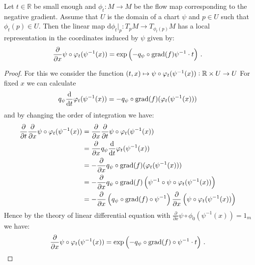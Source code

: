\begin{lemma}
	Let $t\in \mathbb{R}$ be small enough and $\phi_t: M\to M$ be the flow map corresponding to the negative gradient. Assume that $U$ is the domain of a chart $\psi$ and $p\in U$ such that $\phi_t(p)\in U$. Then the linear map $\mathrm{d} \phi_t \big|_p: T_pM\to T_{\phi_t(p)}M$ has a local representation in the coordinates induced by $\psi$ given by:
	\[
\frac{\partial}{\partial x} \psi \circ \varphi_t(\psi^{-1}(x))=\exp\left(- q_{\psi} \circ \mathrm{grad}(f)\psi^{-1} \cdot t \right) \, .
	\]
\end{lemma}
\begin{proof}
For this we consider the function $ (t,x)\mapsto \psi \circ  \varphi_t(\psi^{-1}(x)):\mathbb{R} \times U \to U$ For fixed $x$ we can calculate
\begin{align*}
	q_{\psi}\frac{\mathop{}\!\mathrm{d}}{\mathop{}\!\mathrm{d} t} \varphi_t(\psi^{-1}(x))=-q_{\psi} \circ \mathrm{grad}(f)(\varphi_t(\psi^{-1}(x)))
\end{align*} and by changing the order of integration we have:
\begin{align*}
	\frac{\partial}{\partial t}   \frac{\partial}{\partial x} \psi \circ \varphi_t(\psi^{-1}(x))
	&= \frac{\partial}{\partial x}   \frac{\partial}{\partial t} \psi \circ \varphi_t(\psi^{-1}(x))\\
	&= \frac{\partial}{\partial x} q_\psi \frac{\mathop{}\!\mathrm{d} }{\mathop{}\!\mathrm{d} t}  \varphi_t(\psi^{-1}(x))  \\
	&= -\frac{\partial}{\partial x} q_{\psi} \circ \mathrm{grad}(f)(\varphi_t(\psi^{-1}(x)))	\\
	&= -\frac{\partial}{\partial x} q_{\psi} \circ \mathrm{grad}(f)\left(\psi^{-1}\circ \psi\circ \varphi_t(\psi^{-1}(x))\right)\\
	&=-\frac{\partial}{\partial x} \left( q_{\psi} \circ \mathrm{grad}(f)\circ \psi^{-1} \right)\frac{\partial }{\partial x}  \left(\psi\circ \varphi_t(\psi^{-1}(x))\right)
\end{align*}
Hence by the theory of linear differential equation with $\frac{\partial}{\partial x} \psi \circ \phi_0(\psi^{-1}(x))=1_m$ we have:
\begin{align*}
	\frac{\partial}{\partial x} \psi \circ \varphi_t(\psi^{-1}(x))=\exp\left(- q_{\psi} \circ \mathrm{grad}(f)\circ \psi^{-1}\cdot t \right) \, .
\end{align*}

\end{proof}













